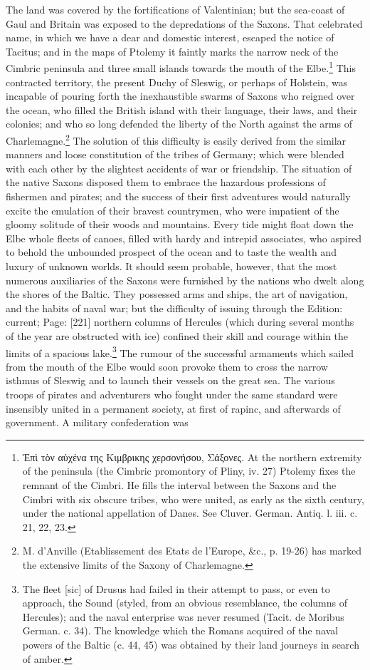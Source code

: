 The land was covered by the fortifications of Valentinian; but the sea-coast of Gaul and Britain was exposed to the depredations of the Saxons. That celebrated name, in which we have a dear and domestic interest, escaped the notice of Tacitus; and in the maps of Ptolemy it faintly marks the narrow neck of the Cimbric peninsula and three small islands towards the mouth of the Elbe.\footnote{\textgreek{\texthebrew{Ἑ}π\texthebrew{ὶ} τ\texthebrew{ὸ}ν α\texthebrew{ὐ}χένα της Κιμβρικης χερσονήσου, Σάξονες}. At the northern extremity of the peninsula (the Cimbric promontory of Pliny, iv. 27) Ptolemy fixes the remnant of the Cimbri. He fills the interval between the Saxons and the Cimbri with six obscure tribes, who were united, as early as the sixth century, under the national appellation of Danes. See Cluver. German. Antiq. l. iii. c. 21, 22, 23.} This contracted territory, the present Duchy of Sleswig, or perhaps of Holstein, was incapable of pouring forth the inexhaustible swarms of Saxons who reigned over the ocean, who filled the British island with their language, their laws, and their colonies; and who so long defended the liberty of the North against the arms of Charlemagne.\footnote{M. d\texthebrew{}’Anville (Etablissement des Etats de l\texthebrew{}’Europe, \&c., p. 19-26) has marked the extensive limits of the Saxony of Charlemagne.} The solution of this difficulty is easily derived from the similar manners and loose constitution of the tribes of Germany; which were blended with each other by the slightest accidents of war or friendship. The situation of the native Saxons disposed them to embrace the hazardous professions of fishermen and pirates; and the success of their first adventures would naturally excite the emulation of their bravest countrymen, who were impatient of the gloomy solitude of their woods and mountains. Every tide might float down the Elbe whole fleets of canoes, filled with hardy and intrepid associates, who aspired to behold the unbounded prospect of the ocean and to taste the wealth and luxury of unknown worlds. It should seem probable, however, that the most numerous auxiliaries of the Saxons were furnished by the nations who dwelt along the shores of the Baltic. They possessed arms and ships, the art of navigation, and the habits of naval war; but the difficulty of issuing through the Edition: current; Page: [221] northern columns of Hercules (which during several months of the year are obstructed with ice) confined their skill and courage within the limits of a spacious lake.\footnote{The fleet [sic] of Drusus had failed in their attempt to pass, or even to approach, the Sound (styled, from an obvious resemblance, the columns of Hercules); and the naval enterprise was never resumed (Tacit. de Moribus German. c. 34). The knowledge which the Romans acquired of the naval powers of the Baltic (c. 44, 45) was obtained by their land journeys in search of amber.} The rumour of the successful armaments which sailed from the mouth of the Elbe would soon provoke them to cross the narrow isthmus of Sleswig and to launch their vessels on the great sea. The various troops of pirates and adventurers who fought under the same standard were insensibly united in a permanent society, at first of rapinc, and afterwards of government. A military confederation was 